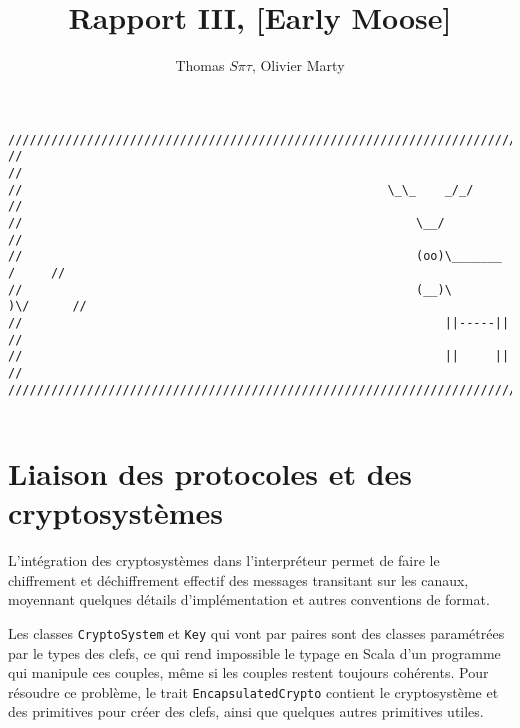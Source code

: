 \documentclass[11pt]{article} %
\title{Rapport III,  [Early Moose]}
\author{Thomas $S\pi\tau$, Olivier Marty}
\begin{document}
\maketitle

\begin{verbatim}
////////////////////////////////////////////////////////////////////////////////
//                                                                            //
//                                                   \_\_    _/_/             //
//                                                       \__/                 //
//                                                       (oo)\_______   /     //
//                                                       (__)\       )\/      //
//                                                           ||-----||        //
//                                                           ||     ||        //
////////////////////////////////////////////////////////////////////////////////  


\end{verbatim}

\section{Liaison des protocoles et des cryptosystèmes}

L'intégration des cryptosystèmes dans l'interpréteur permet de faire le chiffrement et déchiffrement effectif des messages transitant sur les canaux, moyennant quelques détails d'implémentation et autres conventions de format.

Les classes \texttt{CryptoSystem} et \texttt{Key} qui vont par paires sont des classes paramétrées par le types des clefs, ce qui rend impossible le typage en Scala d'un programme qui manipule ces couples, même si les couples restent toujours cohérents. Pour résoudre ce problème, le trait \texttt{EncapsulatedCrypto} contient le cryptosystème et des primitives pour créer des clefs, ainsi que quelques autres primitives utiles.
\end{document}
